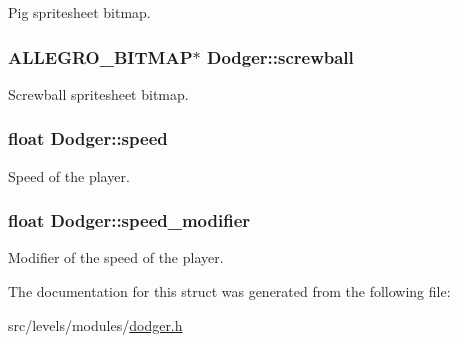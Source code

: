 Pig spritesheet bitmap. \hypertarget{structDodger_a703df249c4b1572717c221aa48588df3}{
\subsubsection[{screwball}]{\setlength{\rightskip}{0pt plus 5cm}A\+L\+L\+E\+G\+R\+O\+\_\+\+B\+I\+T\+M\+A\+P$\ast$ Dodger\+::screwball}}\label{structDodger_a703df249c4b1572717c221aa48588df3}
Screwball spritesheet bitmap. \hypertarget{structDodger_a1a8788405347cc07d8e3332095deb51b}{
\subsubsection[{speed}]{\setlength{\rightskip}{0pt plus 5cm}float Dodger\+::speed}}\label{structDodger_a1a8788405347cc07d8e3332095deb51b}
Speed of the player. \hypertarget{structDodger_a0bcffe9e79d8a419d6943ac33b379a9f}{
\subsubsection[{speed\+\_\+modifier}]{\setlength{\rightskip}{0pt plus 5cm}float Dodger\+::speed\+\_\+modifier}}\label{structDodger_a0bcffe9e79d8a419d6943ac33b379a9f}
Modifier of the speed of the player. 

The documentation for this struct was generated from the following file\+:\begin{DoxyCompactItemize}
\item 
src/levels/modules/\hyperlink{dodger_8h}{dodger.\+h}\end{DoxyCompactItemize}
